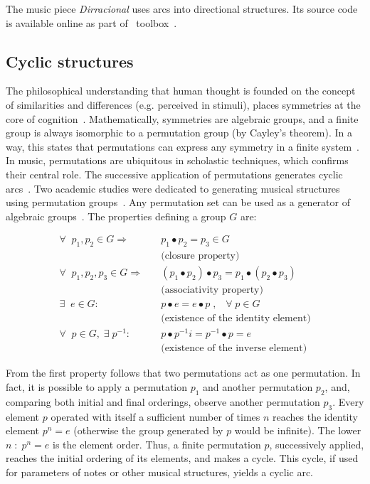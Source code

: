 The music piece \emph{Dirracional} uses arcs into directional structures. Its source code is available online as part
of \massa\ toolbox~\cite{MASSA}.

\subsection{Cyclic structures}\label{estCic}
The philosophical understanding that human thought is founded on the concept of similarities and differences (e.g. perceived in stimuli), places symmetries
at the core of cognition~\cite{Deleuze}. Mathematically, symmetries are algebraic groups, and a finite group is always isomorphic to a permutation
group (by Cayley's theorem).
In a way, this states that permutations can express any symmetry in a
finite system~\cite{gruposFascination}.
In music, permutations are ubiquitous in scholastic techniques,
 which confirms their central role.
The successive application of permutations generates cyclic arcs~\cite{change,Zamacois,permMusic}. Two academic studies were dedicated to generating musical structures using permutation groups~\cite{figgusOriginal, figgusEspacializacao}. Any permutation set can be used as a generator of algebraic groups~\cite{permMusic}.
The properties defining a group $G$ are:

\begin{equation}\label{eq:groups}
\begin{split}
\forall \;\; p_1,p_2 \in G \Rightarrow  \quad   & p_1 \bullet p_2  = p_3 \in G \\ 
     & \text{(closure property)} \\
\forall \;\; p_1,p_2,p_3 \in G \Rightarrow \quad & (p_1\bullet p_2)\bullet p_3  = p_1\bullet (p_2\bullet p_3) \\
     & \text{(associativity property)} \\
\exists \;\; e \in G :                  \quad    & p \bullet e  = e \bullet p \;,\;\;\; \forall\; p \in G  \\ 
     &  \text{(existence of the identity element)} \\
\forall \;\; p \in G, \;\exists\; p^{-1} :\quad  &  p\bullet p^{-1}i =p^{-1}\bullet p = e \\
     &  \text{(existence of the inverse element)}
\end{split}
\end{equation}

From the first property follows that two permutations act as one permutation. In fact, it is possible to apply a
permutation $p_1$ and another permutation $p_2$, and, comparing both initial and final orderings, observe another permutation $p_3$. Every element $p$ operated with itself a sufficient number of times $n$ reaches the identity element $p^n=e$ (otherwise the group generated by $p$ would be infinite). The lower $n\;:\;p^n=e$ is the element order. Thus, a finite
permutation $p$, successively applied, reaches the initial ordering of its
elements, and makes a cycle. This cycle, if used for parameters of notes or other musical structures,
yields a cyclic arc.

